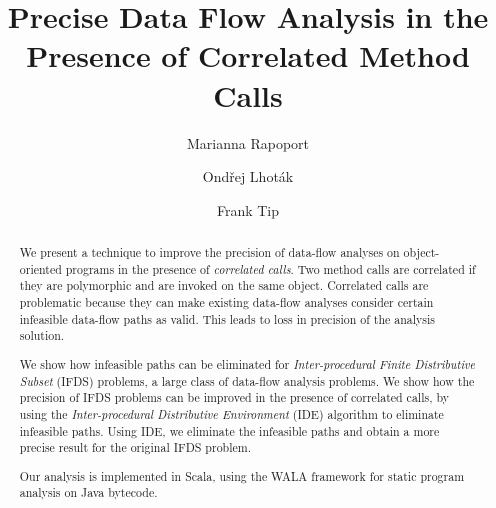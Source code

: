\documentclass[runningheads,a4paper]{llncs}
\newcommand{\keywords}[1]{\par\addvspace\baselineskip
\noindent\keywordname\enspace\ignorespaces#1}
\begin{document}



\mainmatter  %

\title{Precise Data Flow Analysis in the Presence of Correlated Method Calls}

\author{
 Marianna Rapoport \and
 Ond\v{r}ej Lhot\'ak \and
 Frank Tip
}


\maketitle

\begin{abstract}
We present a technique to improve the precision of data-flow analyses on object-oriented programs in the presence of 	\textit{correlated calls}. Two method calls are correlated if they are polymorphic and are invoked on the same object. Correlated calls are problematic because they can make  existing data-flow analyses consider certain infeasible data-flow paths as valid. This leads to loss in precision of the analysis solution.

We show how infeasible paths can be eliminated for \textit{Inter-procedural Finite Distributive Subset} (IFDS) problems, a large class of data-flow analysis problems. We show how the precision of IFDS problems can be improved in the presence of correlated calls, by using the \textit{Inter-procedural Distributive Environment} (IDE) algorithm to eliminate infeasible paths.  Using IDE, we eliminate the infeasible paths and obtain a more precise result for the original IFDS problem.

Our analysis is implemented in Scala, using the WALA framework for static program analysis on Java bytecode.

\end{abstract}





\commentout{}








\end{document}
